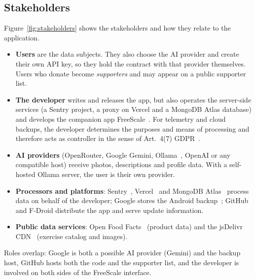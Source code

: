 \documentclass[a4paper,12pt]{article}
\begin{document}
\subsection{Stakeholders}
Figure~\ref{fig:stakeholders} shows the stakeholders and how they relate to the application.
\begin{itemize}
  \item \textbf{Users} are the data subjects. They also choose the AI provider and create their
        own API key, so they hold the contract with that provider themselves. Users who donate
        become \emph{supporters} and may appear on a public supporter list.
  \item \textbf{The developer} writes and releases the app, but also operates the server-side
        services (a Sentry project, a proxy on Vercel and a MongoDB Atlas database) and develops
        the companion app FreeScale~\cite{freescale-repo}. For telemetry and cloud backups, the
        developer determines the purposes and means of processing and therefore acts as
        controller in the sense of Art.~4(7) GDPR~\cite{gdpr}.
  \item \textbf{AI providers} (OpenRouter, Google Gemini, Ollama~\cite{ollama}, OpenAI or any
        compatible host) receive photos, descriptions and profile data. With a self-hosted
        Ollama server, the user is their own provider.
  \item \textbf{Processors and platforms}: Sentry~\cite{sentry-android}, Vercel~\cite{vercel}
        and MongoDB Atlas~\cite{mongodb-atlas} process data on behalf of the developer; Google
        stores the Android backup~\cite{android-autobackup}; GitHub and F-Droid distribute the
        app and serve update information.
  \item \textbf{Public data services}: Open Food Facts~\cite{off-api} (product data) and the
        jsDelivr CDN~\cite{jsdelivr} (exercise catalog and images).
\end{itemize}
Roles overlap: Google is both a possible AI provider (Gemini) and the backup host, GitHub hosts
both the code and the supporter list, and the developer is involved on both sides of the
FreeScale interface.
\end{document}
